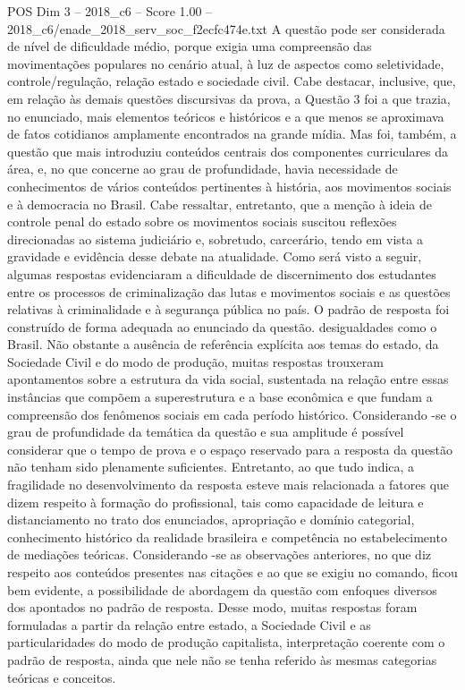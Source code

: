 \begin{textsample}{POS Dim 3 – 2018\_c6 – Score 1.00 – 2018\_c6/enade\_2018\_serv\_soc\_f2ecfc474e.txt}
A questão pode ser considerada de nível de dificuldade médio, porque exigia uma compreensão das movimentações populares no cenário atual, à luz de aspectos como seletividade, controle/regulação, relação estado e sociedade civil.
Cabe destacar, inclusive, que, em relação às demais questões discursivas da prova, a Questão 3 foi a que trazia, no enunciado, mais elementos teóricos e históricos e a que menos se aproximava de fatos cotidianos amplamente encontrados na grande mídia.
Mas foi, também, a questão que mais introduziu conteúdos centrais dos componentes curriculares da área, e, no que concerne ao grau de profundidade, havia necessidade de conhecimentos de vários conteúdos pertinentes à história, aos movimentos sociais e à democracia no Brasil.
Cabe ressaltar, entretanto, que a menção à ideia de controle penal do estado sobre os movimentos sociais suscitou reflexões direcionadas ao sistema judiciário e, sobretudo, carcerário, tendo em vista a gravidade e evidência desse debate na atualidade.
Como será visto a seguir, algumas respostas evidenciaram a dificuldade de discernimento dos estudantes entre os processos de criminalização das lutas e movimentos sociais e as questões relativas à criminalidade e à segurança pública no país.
O padrão de resposta foi construído de forma adequada ao enunciado da questão. desigualdades como o Brasil.
Não obstante a ausência de referência explícita aos temas do estado, da Sociedade Civil e do modo de produção, muitas respostas trouxeram apontamentos sobre a estrutura da vida social, sustentada na relação entre essas instâncias que compõem a superestrutura e a base econômica e que fundam a compreensão dos fenômenos sociais em cada período histórico.
Considerando -se o grau de profundidade da temática da questão e sua amplitude é possível considerar que o tempo de prova e o espaço reservado para a resposta da questão não tenham sido plenamente suficientes.
Entretanto, ao que tudo indica, a fragilidade no desenvolvimento da resposta esteve mais relacionada a fatores que dizem respeito à formação do profissional, tais como capacidade de leitura e distanciamento no trato dos enunciados, apropriação e domínio categorial, conhecimento histórico da realidade brasileira e competência no estabelecimento de mediações teóricas.
Considerando -se as observações anteriores, no que diz respeito aos conteúdos presentes nas citações e ao que se exigiu no comando, ficou bem evidente, a possibilidade de abordagem da questão com enfoques diversos dos apontados no padrão de resposta.
Desse modo, muitas respostas foram formuladas a partir da relação entre estado, a Sociedade Civil e as particularidades do modo de produção capitalista, interpretação coerente com o padrão de resposta, ainda que nele não se tenha referido às mesmas categorias teóricas e conceitos.

\end{textsample}
